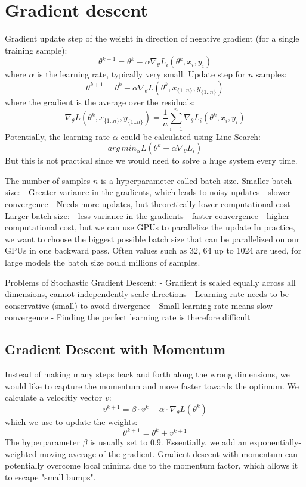 \documentclass{scrartcl}
\begin{document}
\section*{Gradient descent}
Gradient update step of the weight in direction of negative gradient (for a single training sample):
$$\theta^{k+1} = \theta^k - \alpha \nabla_\theta L_i(\theta^k, x_i,y_i)$$
where $\alpha$ is the learning rate, typically very small.
Update step for $n$ samples:
$$\theta^{k+1} = \theta^k - \alpha \nabla_\theta L(\theta^k, x_{\{1..n\}}, y_{\{1..n\}})$$
where the gradient is the average over the residuals:
$$\nabla_\theta L(\theta^k, x_{\{1..n\}}, y_{\{1..n\}}) = \frac{1}{n} \sum_{i=1}^{n} \nabla_\theta L_i(\theta^k, x_i, y_i)$$
Potentially, the learning rate $\alpha$ could be calculated using Line Search:
$$arg \, min_\alpha L(\theta^k - \alpha \nabla_\theta L_i)$$
But this is not practical since we would need to solve a huge system every time.

The number of samples $n$ is a hyperparameter called batch size.
Smaller batch size:
- Greater variance in the gradients, which leads to noisy updates
- slower convergence
- Needs more updates, but theoretically lower computational cost
Larger batch size:
- less variance in the gradients
- faster convergence
- higher computational cost, but we can use GPUs to parallelize the update
In practice, we want to choose the biggest possible batch size that can be parallelized on our GPUs in one backward pass. Often values such as 32, 64 up to 1024 are used, for large models the batch size could millions of samples.

Problems of Stochastic Gradient Descent:
- Gradient is scaled equally across all dimensions, cannot independently scale directions
- Learning rate needs to be conservative (small) to avoid divergence
- Small learning rate means slow convergence
- Finding the perfect learning rate is therefore difficult

\subsection*{Gradient Descent with Momentum}
Instead of making many steps back and forth along the wrong dimensions, we would like to capture the momentum and move faster towards the optimum.
We calculate a velocitiy vector $v$:
$$v^{k+1} = \beta \cdot v^k - \alpha \cdot \nabla_\theta L(\theta^k)$$
which we use to update the weights:
$$\theta^{k+1} = \theta^k + v^{k+1}$$
The hyperparameter $\beta$ is usually set to 0.9.
Essentially, we add an exponentially-weighted moving average of the gradient.
Gradient descent with momentum can potentially overcome local minima due to the momentum factor, which allows it to escape "small bumps".
\end{document}
